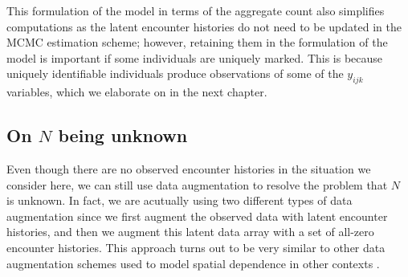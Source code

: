 This formulation of the model in terms of the aggregate count also
simplifies computations as the latent encounter histories
do not need to be updated in the MCMC estimation
scheme; however, retaining them in the formulation of the model
is important if some individuals are uniquely marked. %
This is because
uniquely identifiable individuals produce
observations of some of the $y_{ijk}$ variables, which we elaborate
on in the next chapter.





\subsection{On $N$ being unknown}
\label{unmarked.sec.N}

Even though there are no observed encounter histories in the situation
we consider here, we can still use data augmentation
\citep{tanner_wong:1987,liu_wu:1999} to resolve the
problem that $N$ is unknown. In fact, we are acutually using two
different types of data augmentation since we first augment the
observed data with latent encounter histories, and then we augment
this latent data array with a set of all-zero encounter
histories. This approach turns out to be very similar to other data
augmentation schemes used to model spatial dependence in other contexts
\citep{wolpert_ickstadt:1998,best_etal:2000}.

